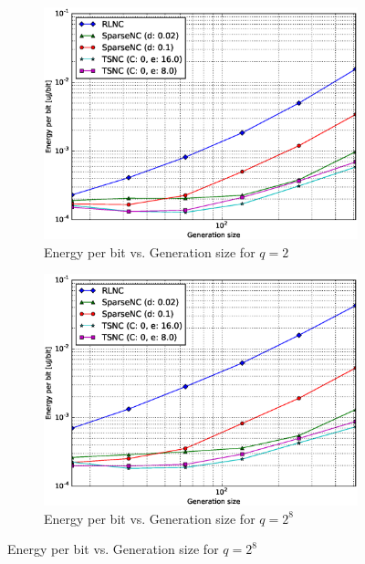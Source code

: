 \begin{figure}
    \centering
    \begin{subfigure}[b]{0.475\textwidth}
        \centering
        \includegraphics[width=1.05\textwidth]{images/06_06_2016/energy_per_bit_vs_generation_size_Rasp_v2_Binary_encoder_1600.eps}
        \caption[]%
        {{\small Energy per bit vs. Generation size for $q = 2$}}
        \label{fig:enc_ene_rasp2_gen_gf2}
    \end{subfigure}
    \hfill
    \begin{subfigure}[b]{0.475\textwidth}
        \centering
        \includegraphics[width=1.05\textwidth]{images/06_06_2016/energy_per_bit_vs_generation_size_Rasp_v2_Binary8_encoder_1600.eps}
        \caption[]%
        {{\small Energy per bit vs. Generation size for $q = 2^8$}}

\end{subfigure}
\end{figure}
